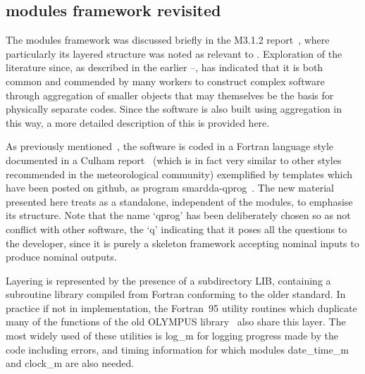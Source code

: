 \subsection{ modules framework revisited}\label{sec:smagain}
The  modules framework was discussed briefly in the M3.1.2 report~\cite{y2re312},
where particularly its layered structure was noted as relevant to \nep.
Exploration of the literature since, as described in the earlier
--, has indicated that it is both common and commended
by many workers to construct complex software through aggregation of smaller objects
that may themselves be the basis for physically separate codes. Since the
 software is also built using aggregation in this way, a more
detailed description of this is provided here.

As previously mentioned~\cite{y2re312}, the  software is coded in a
Fortran language style documented in a Culham report~\cite{fprog}
(which is in fact very similar to other styles recommended in the meteorological
community) exemplified by templates which have been posted on github,
as program smardda-qprog~\cite{qprogwebsite}. The new material presented here treats 
as a standalone, independent of the  modules, to emphasise its structure.
Note that the name `qprog' has been deliberately chosen so as not conflict
with other software, the `q' indicating that it poses all the questions to the
developer, since it is purely a skeleton framework accepting nominal inputs
to produce nominal outputs.

Layering is represented by the presence of a
subdirectory LIB, containing a subroutine library compiled from Fortran 
conforming to the older  standard. In practice if not in implementation,
the Fortran~95 utility routines which duplicate many of the functions of the
old OLYMPUS library~\cite{y2re312} also share this layer. The most widely used
of these utilities  is log\_m for logging progress made by the code including errors,
and timing information for which modules date\_time\_m and clock\_m are also needed.

